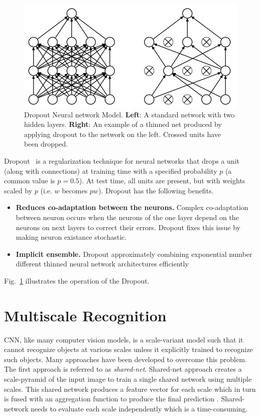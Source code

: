 \begin{figure}
    \begin{center}
        \includegraphics[width=\textwidth]{Figures/oriDropout.png}
        \caption{\label{fig:Dropout} Dropout Neural network Model. \textbf{Left}: A standard network with two hidden layers. \textbf{Right}: An example of a thinned net produced by applying dropout to the network on the left. Crossed units have been dropped.}
    \end{center}
\end{figure}
Dropout~\cite{srivastava2014dropout} is a regularization technique for neural networks that drops a unit (along with connections) at training time with a specified probability $p$ (a common value is $p=0.5$). At test time, all units are present, but with weights scaled by $p$ (i.e. $w$ becomes $pw$).
Dropout has the following benefits. 
\begin{itemize}
    \item \textbf{Reduces co-adaptation between the neurons.} Complex co-adaptation between neuron occurs when the neurons of the one layer depend on the neurons on next layers to correct their errors. Dropout fixes this issue by making neuron existance stochastic.
    \item \textbf{Implicit ensemble.} Dropout  approximately combining exponential number different thinned neural network architectures efficiently
\end{itemize}
Fig.~\ref{fig:Dropout} illustrates the operation of the Dropout.

\section{Multiscale Recognition}
CNN,  like many computer vision models, is a scale-variant \cite{van2017learning} model such that it cannot recognize objects at various scales unless it explicitly trained to recognize such objects. Many approaches have been developed to overcome this problem. The first approach is referred to as \textit{shared-net}. Shared-net approach creates a scale-pyramid of the input image  to train a single shared network using  multiple scales. This shared network produces a feature vector for each scale which in turn is fused with an aggregation function to produce the final prediction \cite{farabet2012learning}\cite{lin2016efficient}\cite{felzenszwalb2009object}\cite{ciregan2012multi}. Shared-network needs to evaluate each scale independently which is a time-consuming.

